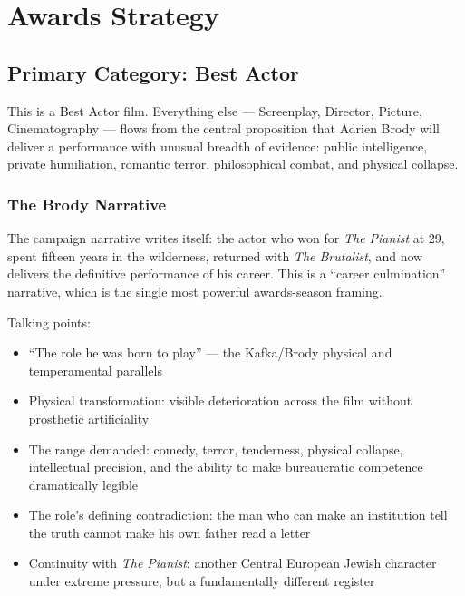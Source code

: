 
\section{Awards Strategy}

\subsection{Primary Category: Best Actor}

This is a Best Actor film. Everything else --- Screenplay, Director, Picture, Cinematography --- flows from the central proposition that Adrien Brody will deliver a performance with unusual breadth of evidence: public intelligence, private humiliation, romantic terror, philosophical combat, and physical collapse.

\subsubsection{The Brody Narrative}
The campaign narrative writes itself: the actor who won for \textit{The Pianist} at 29, spent fifteen years in the wilderness, returned with \textit{The Brutalist}, and now delivers the definitive performance of his career. This is a ``career culmination'' narrative, which is the single most powerful awards-season framing.

Talking points:
\begin{itemize}[leftmargin=*]
\item ``The role he was born to play'' --- the Kafka/Brody physical and temperamental parallels
\item Physical transformation: visible deterioration across the film without prosthetic artificiality
\item The range demanded: comedy, terror, tenderness, physical collapse, intellectual precision, and the ability to make bureaucratic competence dramatically legible
\item The role's defining contradiction: the man who can make an institution tell the truth cannot make his own father read a letter
\item Continuity with \textit{The Pianist}: another Central European Jewish character under extreme pressure, but a fundamentally different register
\end{itemize}

